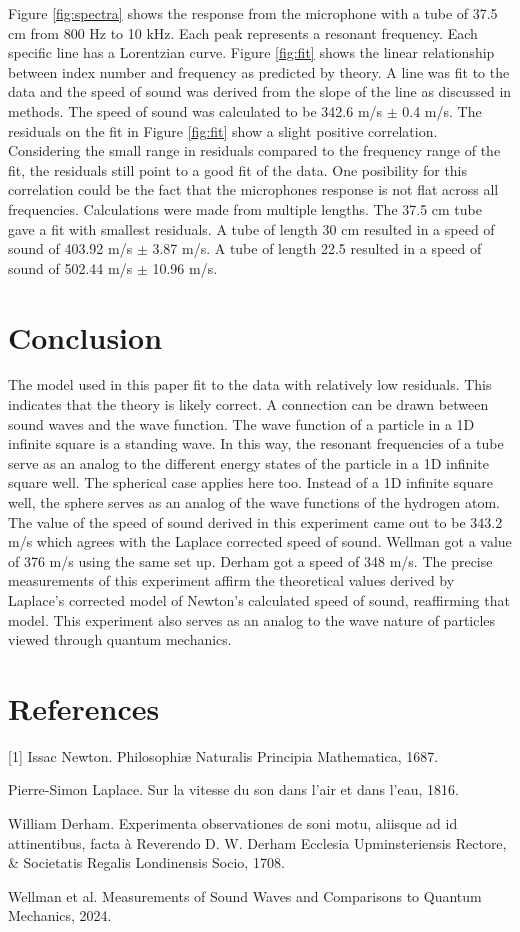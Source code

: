 \documentclass[a4paper, 12pt, twocolumn]{article}
\begin{document}
Figure \ref{fig:spectra} shows the response from the microphone with a tube of 37.5 cm from 800 Hz to 10 kHz. Each peak represents a resonant frequency. Each specific line has a Lorentzian curve. Figure \ref{fig:fit} shows the linear relationship between index number and frequency as predicted by theory. A line was fit to the data and the speed of sound was derived from the slope of the line as discussed in methods. The speed of sound was calculated to be 342.6 m/s $\pm$ 0.4 m/s. The residuals on the fit in Figure \ref{fig:fit} show a slight positive correlation. Considering the small range in residuals compared to the frequency range of the fit, the residuals still point to a good fit of the data. One posibility for this correlation could be the fact that the microphones response is not flat across all frequencies. Calculations were made from multiple lengths. The 37.5 cm tube gave a fit with smallest residuals. A tube of length 30 cm resulted in a speed of sound of 403.92 m/s $\pm$ 3.87 m/s. A tube of length 22.5 resulted in a speed of sound of 502.44 m/s $\pm$ 10.96 m/s.
\section{Conclusion}
The model used in this paper fit to the data with relatively low residuals. This indicates that the theory is likely correct. A connection can be drawn between sound waves and the wave function. The wave function of a particle in a 1D infinite square is a standing wave. In this way, the resonant frequencies of a tube serve as an analog to the different energy states of the particle in a 1D infinite square well. The spherical case applies here too. Instead of a 1D infinite square well, the sphere serves as an analog of the wave functions of the hydrogen atom. The value of the speed of sound derived in this experiment came out to be 343.2 m/s which agrees with the Laplace corrected speed of sound. Wellman got a value of 376 m/s using the same set up. Derham got a speed of 348 m/s. The precise measurements of this experiment affirm the theoretical values derived by Laplace's corrected model of Newton's calculated speed of sound, reaffirming that model. This experiment also serves as an analog to the wave nature of particles viewed through quantum mechanics.
\section*{References}
[1] Issac Newton. Philosophiæ Naturalis Principia Mathematica, 1687.
\par\noindent
[2] Pierre-Simon Laplace. Sur la vitesse du son dans l'air et dans l'eau, 1816.
\par\noindent
[3] William Derham. Experimenta observationes de soni motu, aliisque ad id attinentibus, facta à Reverendo D. W. Derham Ecclesia Upminsteriensis Rectore, & Societatis Regalis Londinensis Socio, 1708. 
\par\noindent
[4] Wellman et al. Measurements of Sound Waves and
Comparisons to Quantum Mechanics, 2024.
\end{document}
